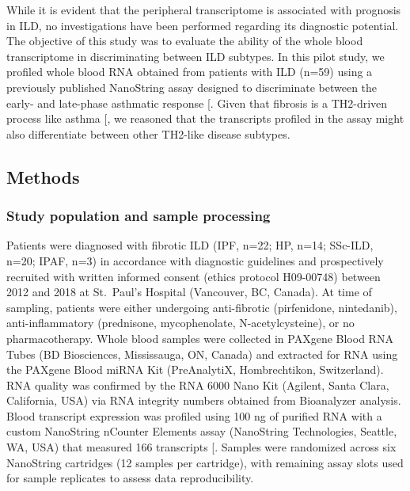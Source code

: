 \documentclass[
]{article}
\begin{document}
While it is evident that the peripheral transcriptome is associated with prognosis in ILD, no investigations have been performed regarding its diagnostic potential. The objective of this study was to evaluate the ability of the whole blood transcriptome in discriminating between ILD subtypes. In this pilot study, we profiled whole blood RNA obtained from patients with ILD (n=59) using a previously published NanoString assay designed to discriminate between the early- and late-phase asthmatic response {[}\citeproc{ref-singh_novel_2018}{103}{]}. Given that fibrosis is a TH2-driven process like asthma {[}\citeproc{ref-spagnolo_role_2022}{104}{]}, we reasoned that the transcripts profiled in the assay might also differentiate between other TH2-like disease subtypes.

\subsection{Methods}\label{methods-1}

\subsubsection{Study population and sample processing}\label{study-population-and-sample-processing}

Patients were diagnosed with fibrotic ILD (IPF, n=22; HP, n=14; SSc-ILD, n=20; IPAF, n=3) in accordance with diagnostic guidelines and prospectively recruited with written informed consent (ethics protocol H09-00748) between 2012 and 2018 at St.~Paul's Hospital (Vancouver, BC, Canada). At time of sampling, patients were either undergoing anti-fibrotic (pirfenidone, nintedanib), anti-inflammatory (prednisone, mycophenolate, N-acetylcysteine), or no pharmacotherapy. Whole blood samples were collected in PAXgene Blood RNA Tubes (BD Biosciences, Mississauga, ON, Canada) and extracted for RNA using the PAXgene Blood miRNA Kit (PreAnalytiX, Hombrechtikon, Switzerland). RNA quality was confirmed by the RNA 6000 Nano Kit (Agilent, Santa Clara, California, USA) via RNA integrity numbers obtained from Bioanalyzer analysis. Blood transcript expression was profiled using 100 ng of purified RNA with a custom NanoString nCounter Elements assay (NanoString Technologies, Seattle, WA, USA) that measured 166 transcripts {[}\citeproc{ref-singh_novel_2018}{103}{]}. Samples were randomized across six NanoString cartridges (12 samples per cartridge), with remaining assay slots used for sample replicates to assess data reproducibility.
\end{document}
